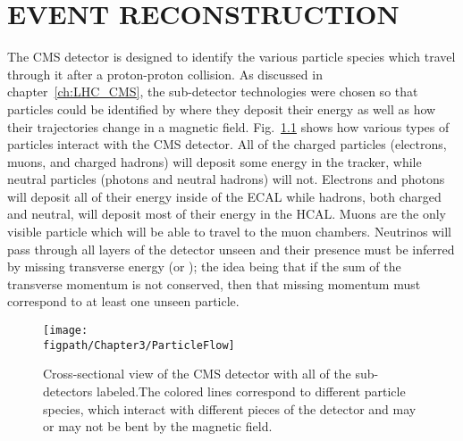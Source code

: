 %
%
%



\chapter{\uppercase {Event Reconstruction}}
\label{ch:event_reconstruction}

The CMS detector is designed to identify the various particle species which travel through it after a proton-proton collision.
As discussed in chapter~\ref{ch:LHC_CMS}, the sub-detector technologies were chosen so that particles could be identified by where they deposit their energy as well as how their trajectories change in a magnetic field.
Fig.~\ref{fig:particle_flow} shows how various types of particles interact with the CMS detector.
All of the charged particles (\ie electrons, muons, and charged hadrons) will deposit some energy in the tracker, while neutral particles (\ie photons and neutral hadrons) will not.
Electrons and photons will deposit all of their energy inside of the ECAL while hadrons, both charged and neutral, will deposit most of their energy in the HCAL.
Muons are the only visible particle which will be able to travel to the muon chambers.
Neutrinos will pass through all layers of the detector unseen and their presence must be inferred by missing transverse energy (\MET or \ETslash); the idea being that if the sum of the transverse momentum is not conserved, then that missing momentum must correspond to at least one unseen particle.

\begin{figure}[!hbt]
    \centering
    \texttt{[image: \\figpath/Chapter3/ParticleFlow]}
    \caption{Cross-sectional view of the CMS detector with all of the sub-detectors labeled.The colored lines correspond to different particle species, which interact with different pieces of the detector and may or may not be bent by the magnetic field.}
    \label{fig:particle_flow}
\end{figure}

